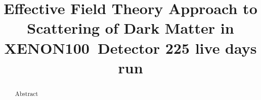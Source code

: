 \documentclass[twocolumn, showpacs, showkeys, amsmath, amssymb, floatfix, linenumbers]{revtex4-1}
\newcommand{\Xehund}{{XENON100}}
\begin{document}

\title{Effective Field Theory Approach to Scattering of Dark Matter in  \Xehund\ Detector 225 live days run}
%


\begin{abstract} 

Abstract
\end{abstract}

\pacs{}

\maketitle 












%


\end{document}

